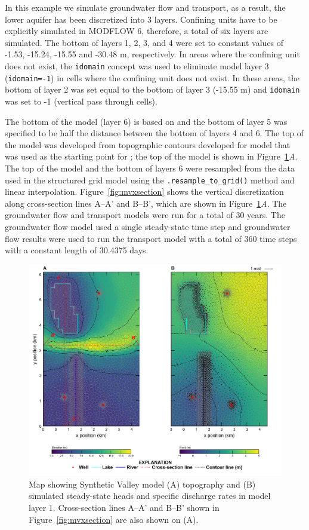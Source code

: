 \documentclass[11pt, oneside]{article}  	%
\begin{document}
In this example we simulate groundwater flow and transport, as a result, the lower aquifer has been discretized into 3 layers. Confining units have to be explicitly simulated in MODFLOW 6, therefore, a total of six layers are simulated. The bottom of layers 1, 2, 3, and 4 were set to constant values of -1.53, -15.24, -15.55 and -30.48 m, respectively. In areas where the confining unit does not exist, the \texttt{idomain} concept was used to eliminate model layer 3 (\texttt{idomain=-1}) in cells where the confining unit does not exist. In these areas, the bottom of layer 2 was set equal to the bottom of layer 3 (-15.55 m) and \texttt{idomain} was set to -1 (vertical pass through cells). 

The bottom of the model (layer 6) is based on \cite{hill1998} and the bottom of layer 5 was specified to be half the distance between the bottom of layers 4 and 6. The top of the model was developed from topographic contours developed for model that was used as the starting point for \cite{hill1998} \citep{pollock2014percomm}; the top of the model is shown in Figure~\ref{fig:mvmap}\textit{A}. The top of the model and the bottom of layers 6 were resampled from the data used in the structured grid model using the \texttt{.resample\_to\_grid()} method and linear interpolation.  Figure~\ref{fig:mvxsection} shows the vertical discretization along cross-section lines A--A' and B--B', which are shown in Figure~\ref{fig:mvmap}\textit{A}. The groundwater flow and transport models were run for a total of 30 years. The groundwater flow model used a single steady-state time step and groundwater flow results were used to run the transport model with a total of 360 time steps with a constant length of 30.4375 days.

\begin{figure}[ht!]
	\begin{center}
		\includegraphics{figures/mv_voronoi_map.png}
	\end{center}
	\caption{Map showing Synthetic Valley model (A) topography and (B) simulated steady-state heads and specific discharge rates in model layer 1. Cross-section lines A--A' and B--B' shown in Figure~\ref{fig:mvxsection} are also shown on (A).}
	\label{fig:mvmap}
\end{figure}
\end{document}
